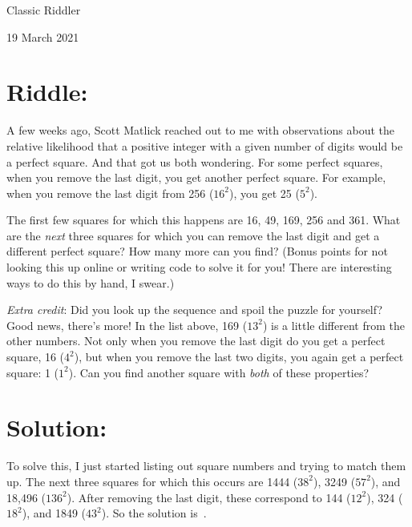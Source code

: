 \documentclass{article}
\begin{document}
\pagestyle{empty} %

\begin{center}
{\LARGE Classic Riddler}

\vspace{0.15in}

{\Large 19 March 2021}
\end{center}


\section*{Riddle:}

A few weeks ago, Scott Matlick reached out to me with observations about the relative likelihood that a positive integer with a given number of digits would be a perfect square.
And that got us both wondering.
For some perfect squares, when you remove the last digit, you get another perfect square.
For example, when you remove the last digit from 256 ($16^{2}$), you get 25 ($5^{2}$).

The first few squares for which this happens are 16, 49, 169, 256 and 361.
What are the \textit{next} three squares for which you can remove the last digit and get a different perfect square?
How many more can you find?
(Bonus points for not looking this up online or writing code to solve it for you!
There are interesting ways to do this by hand, I swear.)

\textit{Extra credit}: Did you look up the sequence and spoil the puzzle for yourself?
Good news, there’s more!
In the list above, 169 ($13^{2}$) is a little different from the other numbers.
Not only when you remove the last digit do you get a perfect square, 16 ($4^{2}$), but when you remove the last two digits, you again get a perfect square: 1 ($1^{2}$).
Can you find another square with \textit{both} of these properties?



\section*{Solution:}

To solve this, I just started listing out square numbers and trying to match them up.
The next three squares for which this occurs are 1444 ($38^{2}$), 3249 ($57^{2}$), and 18,496 ($136^{2}$).
After removing the last digit, these correspond to 144 ($12^{2}$), 324 ($18^{2}$), and 1849 ($43^{2}$).
So the solution is
\,.
\end{document}
